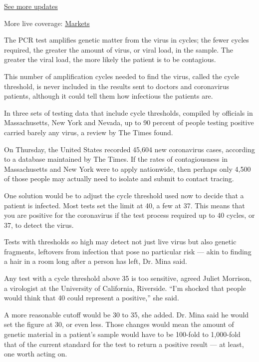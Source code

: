 \href{https://www.nytimes3xbfgragh.onion/2020/09/11/world/covid-19-coronavirus.html?action=click\&pgtype=Article\&state=default\&region=MAIN_CONTENT_1\&context=storylines_live_updates}{See
more updates}

More live coverage:
\href{https://www.nytimes3xbfgragh.onion/live/2020/09/11/business/stock-market-today-coronavirus?action=click\&pgtype=Article\&state=default\&region=MAIN_CONTENT_1\&context=storylines_live_updates}{Markets}

The PCR test amplifies genetic matter from the virus in cycles; the
fewer cycles required, the greater the amount of virus, or viral load,
in the sample. The greater the viral load, the more likely the patient
is to be contagious.

This number of amplification cycles needed to find the virus, called the
cycle threshold, is never included in the results sent to doctors and
coronavirus patients, although it could tell them how infectious the
patients are.

In three sets of testing data that include cycle thresholds, compiled by
officials in Massachusetts, New York and Nevada, up to 90 percent of
people testing positive carried barely any virus, a review by The Times
found.

On Thursday, the United States recorded 45,604 new coronavirus cases,
according to a database maintained by The Times. If the rates of
contagiousness in Massachusetts and New York were to apply nationwide,
then perhaps only 4,500 of those people may actually need to isolate and
submit to contact tracing.

One solution would be to adjust the cycle threshold used now to decide
that a patient is infected. Most tests set the limit at 40, a few at 37.
This means that you are positive for the coronavirus if the test process
required up to 40 cycles, or 37, to detect the virus.

Tests with thresholds so high may detect not just live virus but also
genetic fragments, leftovers from infection that pose no particular risk
--- akin to finding a hair in a room long after a person has left, Dr.
Mina said.

Any test with a cycle threshold above 35 is too sensitive, agreed Juliet
Morrison, a virologist at the University of California, Riverside. ``I'm
shocked that people would think that 40 could represent a positive,''
she said.

A more reasonable cutoff would be 30 to 35, she added. Dr. Mina said he
would set the figure at 30, or even less. Those changes would mean the
amount of genetic material in a patient's sample would have to be
100-fold to 1,000-fold that of the current standard for the test to
return a positive result --- at least, one worth acting on.

